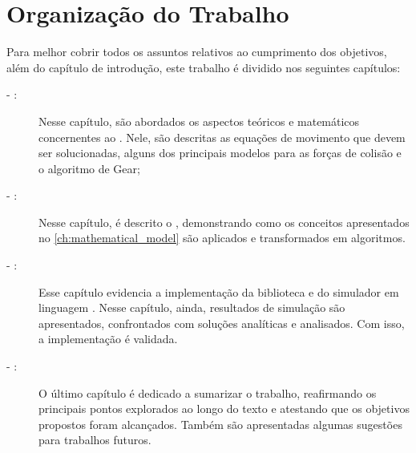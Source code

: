 \section{Organização do Trabalho}

Para melhor cobrir todos os assuntos relativos ao cumprimento dos objetivos, além do capítulo de introdução, este trabalho é dividido nos seguintes capítulos:
\begin{description}
	\item[ - :] Nesse capítulo, são abordados os aspectos teóricos e matemáticos concernentes ao \DEM{}. Nele, são descritas as equações de movimento que devem ser solucionadas, alguns dos principais modelos para as forças de colisão e o algoritmo de Gear;
	\item[ - :] Nesse capítulo, é descrito o \DEM{}, demonstrando como os conceitos apresentados no \cref{ch:mathematical_model} são aplicados e transformados em algoritmos.
	\item[ - :] Esse capítulo evidencia a implementação da biblioteca e do simulador em linguagem \CPP{}. Nesse capítulo, ainda, resultados de simulação são apresentados, confrontados com soluções analíticas e analisados. Com isso, a implementação é validada.
	\item[ - :] O último capítulo é dedicado a sumarizar o trabalho, reafirmando os principais pontos explorados ao longo do texto e atestando que os objetivos propostos foram alcançados. Também são apresentadas algumas sugestões para trabalhos futuros.
\end{description}